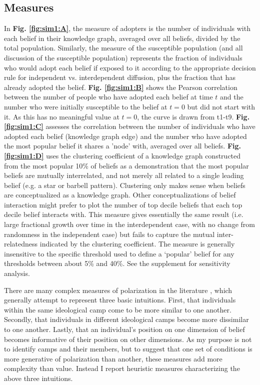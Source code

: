 \documentclass[9pt,twocolumn,twoside,lineno]{pnas-new}
\begin{document}
{\subsection*{Measures}

In \textbf{Fig. \ref{fig:sim1:A}}, the measure of adopters is the number of individuals with each belief in their knowledge graph, averaged over all beliefs, divided by the total population. Similarly, the measure of the susceptible population (and all discussion of the susceptible population) represents the fraction of individuals who would adopt each belief if exposed to it according to the appropriate decision rule for independent vs. interdependent diffusion, plus the fraction that has already adopted the belief. 
\textbf{Fig. \ref{fig:sim1:B}} shows the Pearson correlation between the number of people who have adopted each belief at time $t$ and the number who were initially susceptible to the belief at $t=0$ but did not start with it. As this has no meaningful value at $t=0$, the curve is drawn from t1-t9.
\textbf{Fig. \ref{fig:sim1:C}} assesses the correlation between the number of individuals who have adopted each belief (knowledge graph edge) and the number who have adopted the most popular belief it shares a 'node' with, averaged over all beliefs. 
\textbf{Fig. \ref{fig:sim1:D}} uses the clustering coefficient of a knowledge graph constructed from the most popular 10\% of beliefs as a demonstration that the most popular beliefs are mutually interrelated, and not merely all related to a single leading belief (e.g. a star or barbell pattern). Clustering only makes sense when beliefs are conceptualized as a knowledge graph. Other conceptualizations of belief interaction might prefer to plot the number of top decile beliefs that each top decile belief interacts with. This measure gives essentially the same result (i.e. large fractional growth over time in the interdependent case, with no change from randomness in the independent case) but fails to capture the mutual inter-relatedness indicated by the clustering coefficient. The measure is generally insensitive to the specific threshold used to define a ‘popular’ belief for any thresholds between about 5\% and 40\%. See the supplement for sensitivity analysis. 

There are many complex measures of polarization in the literature \cite[for a sample]{baldassarri2007dynamics,dellaposta2015liberals,goldberg2018beyond,flache2011small,del2016echo,dandekar2013biased,vasconcelos2019consensus,spohr2017fake,tornberg2018echo,pennycook2019lazy}, which generally attempt to represent three basic intuitions. First, that individuals within the same ideological camp come to be more similar to one another. Secondly, that individuals in different ideological camps become more dissimilar to one another. Lastly, that an individual’s position on one dimension of belief becomes informative of their position on other dimensions. As my purpose is not to identify camps and their members, but to suggest that one set of conditions is more generative of polarization than another, these measures add more complexity than value. Instead I report heuristic measures characterizing the above three intuitions.

}
\end{document}
